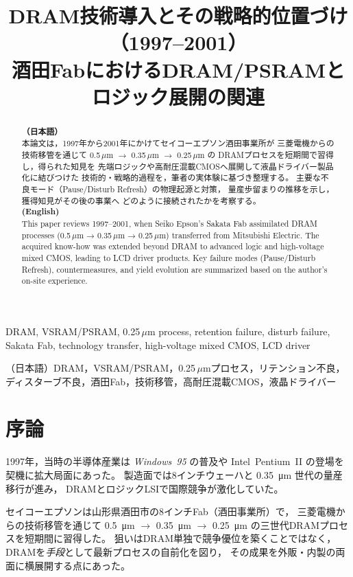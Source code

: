 \documentclass[conference]{IEEEtran}
\title{DRAM技術導入とその戦略的位置づけ（1997--2001）\\
\large 酒田FabにおけるDRAM/PSRAMとロジック展開の関連}
\author{%
  \IEEEauthorblockN{三溝 真一 (Shinichi Samizo)}%
  \IEEEauthorblockA{独立系半導体研究者（元セイコーエプソン）\\%
  Independent Semiconductor Researcher (ex-Seiko Epson)\\%
  Email: \href{mailto:shin3t72@gmail.com}{shin3t72@gmail.com}\\%
  GitHub: \url{https://github.com/Samizo-AITL}}%
}
\begin{document}
\maketitle

\begin{abstract}
\textbf{（日本語）}\\
本論文は，1997年から2001年にかけてセイコーエプソン酒田事業所が
三菱電機からの技術移管を通じて \mbox{0.5\,$\mu$m} $\rightarrow$ \mbox{0.35\,$\mu$m} $\rightarrow$ \mbox{0.25\,$\mu$m} の
DRAMプロセスを短期間で習得し，得られた知見を
先端ロジックや高耐圧混載CMOSへ展開して液晶ドライバー製品化に結びつけた
技術的・戦略的過程を，筆者の実体験に基づき整理する。
主要な不良モード（Pause/Disturb Refresh）の物理起源と対策，
量産歩留まりの推移を示し，獲得知見がその後の事業へ
どのように接続されたかを考察する。\\[1ex]

\textbf{(English)}\\
This paper reviews 1997–2001, when Seiko Epson’s Sakata Fab
assimilated DRAM processes (0.5\,$\mu$m → 0.35\,$\mu$m → 0.25\,$\mu$m) transferred from Mitsubishi Electric.
The acquired know-how was extended beyond DRAM to advanced logic
and high-voltage mixed CMOS, leading to LCD driver products.
Key failure modes (Pause/Disturb Refresh), countermeasures, and yield evolution
are summarized based on the author’s on-site experience.
\end{abstract}

\begin{IEEEkeywords}
DRAM, VSRAM/PSRAM, 0.25\,$\mu$m process, retention failure, disturb failure, Sakata Fab, technology transfer, high-voltage mixed CMOS, LCD driver

\hspace{1em}（日本語）DRAM，VSRAM/PSRAM，0.25\,$\mu$mプロセス，リテンション不良，ディスターブ不良，酒田Fab，技術移管，高耐圧混載CMOS，液晶ドライバー
\end{IEEEkeywords}

\section{序論}
1997年，当時の半導体産業は \textit{Windows~95} の普及や
Intel~Pentium~II の登場を契機に拡大局面にあった。
製造面では8インチウェーハと \SI{0.35}{\micro\meter} 世代の量産移行が進み，
DRAMとロジックLSIで国際競争が激化していた。

セイコーエプソンは山形県酒田市の8インチFab（酒田事業所）で，
三菱電機からの技術移管を通じて
\SI{0.5}{\micro\meter} $\rightarrow$ \SI{0.35}{\micro\meter} $\rightarrow$ \SI{0.25}{\micro\meter}
の三世代DRAMプロセスを短期間に習得した。  
狙いはDRAM単独で競争優位を築くことではなく，
DRAMを\emph{手段}として最新プロセスの自前化を図り，
その成果を外販・内製の両面に横展開する点にあった。  
\end{document}
